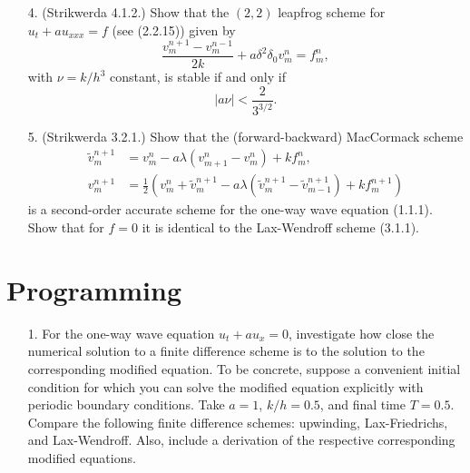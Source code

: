 \documentclass{article}
\providecommand{\abs}[1]{\left\lvert#1\right\rvert}
\begin{document}
\begin{itemize}
\item[4.] (Strikwerda 4.1.2.) Show that the $(2,2)$ leapfrog scheme for $u_t + a u_{xxx} = f$ (see (2.2.15)) given by
\begin{equation*}
\frac{v^{n+1}_m - v^{n-1}_m}{2k} + a \delta^2 \delta_0 v^n_m = f^n_m,
\end{equation*}
with $\nu = k / h^3$ constant, is stable if and only if
\begin{equation*}
\abs{a \nu} < \frac{2}{3^{3/2}}.
\end{equation*}

\item[5.] (Strikwerda 3.2.1.) Show that the (forward-backward) MacCormack scheme
\begin{align*}
\tilde{v}^{n+1}_m & = v^n_m - a \lambda \left( v^n_{m+1} - v^n_m \right) + k f^n_m, \\
v^{n+1}_m & = \frac{1}{2} \left( v^n_m + \tilde{v}^{n+1}_m - a \lambda \left( \tilde{v}^{n+1}_m - \tilde{v}^{n+1}_{m-1} \right) + k f^{n+1}_m \right)
\end{align*}
is a second-order accurate scheme for the one-way wave equation (1.1.1). Show that for $f = 0$ it is identical to the Lax-Wendroff scheme (3.1.1).

\end{itemize}

\section{Programming}

\begin{itemize}

\item[1.] For the one-way wave equation $u_t + a u_x = 0$, investigate how close the numerical solution to a finite difference scheme is to the solution to the corresponding modified equation. To be concrete, suppose a convenient initial condition for which you can solve the modified equation explicitly with periodic boundary conditions. Take $a = 1$, $k/h = 0.5$, and final time $T = 0.5$. Compare the following finite difference schemes: upwinding, Lax-Friedrichs, and Lax-Wendroff. Also, include a derivation of the respective corresponding modified equations.

\end{itemize}
\end{document}
